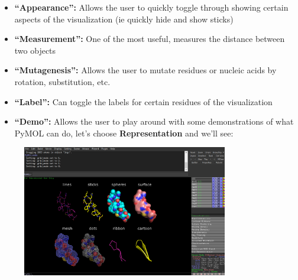 \documentclass{article}
\begin{document}
\begin{itemize}

\item \textbf{“Appearance”:} Allows the user to quickly toggle through showing certain aspects of the visualization (ie quickly hide and show sticks)

\item \textbf{“Measurement”:} One of the most useful, measures the distance between two objects

\item \textbf{“Mutagenesis”:} Allows the user to mutate residues or nucleic acids by rotation, substitution, etc. 

\item \textbf{“Label”:} Can toggle the labels for certain residues of the visualization

\item \textbf{“Demo”:} Allows the user to play around with some demonstrations of what PyMOL can do, let's choose \textbf{Representation} and we'll see:

\end{itemize}

\begin{figure}[h!]
    \centering
    \includegraphics[width=0.8\textwidth]{workshops/pymol/imgs/representation.png}
    \caption[]{}
    \label{representation}
\end{figure}
\end{document}
